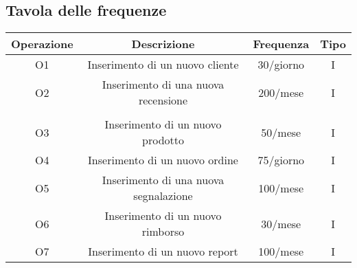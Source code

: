 \subsection{Tavola delle frequenze}
\begin{center}
\begin{tabular}{ |c|c|c|c|} 
\hline
Operazione & Descrizione & Frequenza & Tipo \\
\hline
\multirow{3}{6em}{O1} & \multirow{3}{8em}{Inserimento di un nuovo cliente} & \multirow{3}{12em}{30/giorno} & \multirow{3}{12em}{I}\\
 & & &\\
 & & &\\
\hline

\multirow{3}{6em}{O2} & \multirow{3}{8em}{Inserimento di una nuova recensione} & \multirow{3}{12em}{200/mese} & \multirow{3}{12em}{I}\\
 & & &\\
 & & &\\
 & & &\\
 \hline

\multirow{3}{6em}{O3} & \multirow{3}{8em}{Inserimento di un nuovo prodotto} & \multirow{3}{12em}{50/mese} & \multirow{3}{12em}{I}\\
 & & &\\
 & & &\\
\hline

\multirow{3}{6em}{O4} & \multirow{3}{8em}{Inserimento di un nuovo ordine} & \multirow{3}{12em}{75/giorno} & \multirow{3}{12em}{I}\\
 & & &\\
 & & &\\
\hline

\multirow{3}{6em}{O5} & \multirow{3}{8em}{Inserimento di una nuova segnalazione} & \multirow{3}{12em}{100/mese} & \multirow{3}{12em}{I}\\
 & & &\\
 & & &\\
\hline

\multirow{3}{6em}{O6} & \multirow{3}{8em}{Inserimento di un nuovo rimborso} & \multirow{3}{12em}{30/mese} & \multirow{3}{12em}{I}\\
 & & &\\
 & & &\\
\hline

\multirow{3}{6em}{O7} & \multirow{3}{8em}{Inserimento di un nuovo report} & \multirow{3}{12em}{100/mese} & \multirow{3}{12em}{I}\\
 & & &\\
 & & &\\
\hline


\end{tabular}
\end{center}
